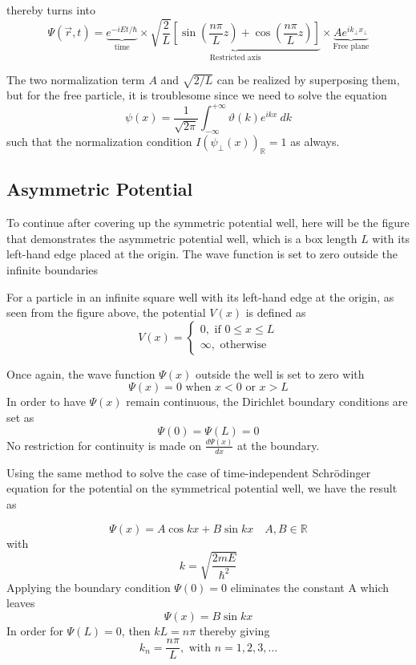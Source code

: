 thereby turns into 
\begin{equation}
    \Psi(\vec{r},t) = \underbrace{e^{-iEt/\hbar}}_{\text{time}} \times \underbrace{\sqrt{\frac{2}{L}} \left[\sin{\left(\frac{n\pi}{L}z\right)} + \cos{\left(\frac{n\pi}{L}z\right)}\right]}_{\text{Restricted axis}} \times \underbrace{Ae^{ik_{\perp}x_{\perp}}}_{\text{Free plane}}
\end{equation}

The two normalization term $A$ and $\sqrt{2/L}$ can be realized by superposing them, but for the free particle, it is troublesome since we need to solve the equation \begin{equation}
    \psi(x) = \frac{1}{\sqrt{2\pi}} \int_{-\infty}^{+\infty} \vartheta(k) e^{ikx} \: dk
\end{equation}
such that the normalization condition $I(\psi_{\perp}(x))_{\mathbb{R}}= 1$ as always. 

\subsection{Asymmetric Potential}

To continue after covering up the symmetric potential well, here will be the figure that demonstrates the asymmetric potential well, which is a box length $L$ with its left-hand edge placed at the origin. The wave function is set to zero outside the infinite boundaries

For a particle in an infinite square well with its left-hand edge at the origin, as seen from the figure above, the potential $V(x)$ is defined as 
\begin{equation}
  V(x)=\begin{cases}
    0, \text{ if } 0\le x \le L \\ 
    \infty, \text{ otherwise }
    \end{cases}
\end{equation}

Once again, the wave function $\Psi(x)$ outside the well is set to zero with $$\Psi(x)=0 \text{ when } x<0 \text{ or } x >L$$
In order to have $\Psi(x)$ remain continuous, the Dirichlet boundary conditions are set as $$\Psi(0)=\Psi(L)=0$$
No restriction for continuity is made on $\frac{d\Psi(x)}{dx}$ at the boundary.
  
Using the same method to solve the case of time-independent Schrödinger equation for the potential on the symmetrical potential well, we have the result as 

\begin{equation}
  \Psi(x) = A\cos kx + B\sin kx \quad A,B \in \mathbb{R}
\end{equation}
with $$k = \sqrt{ \frac{2mE}{\hbar^2} }$$
Applying the boundary condition $\Psi(0)=0$ eliminates the constant A which leaves$$\Psi(x) = B\sin kx$$
In order for $\Psi(L)=0$, then $kL=n\pi$ thereby giving 
\begin{equation}
  k_{n} = \frac{n\pi}{L}, \text{ with }n=1,2,3, \ldots
\end{equation}

